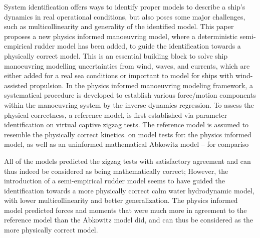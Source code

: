 
System identification offers ways to identify proper models to describe a ship's dynamics in real operational conditions, but also poses some major challenges, such as multicollinearity and generality of the identified model. 
This paper proposes a new physics informed manoeuvring model, where a deterministic semi-empirical rudder model has been added, to guide the identification towards a physically correct model.  
This is an essential building block to solve ship manoeuvring modelling uncertainties from wind, waves, and currents, which are either added for a real sea conditions or important to model for ships with wind-assisted propulsion.
In the physics informed manoeuvring modeling framework, a systematical procedure is developed to establish various force/motion components within the manoeuvring system by the inverse dynamics regression. 
To assess the physical correctness, a reference model, is first established via parameter identification on virtual captive zigzag tests. The reference model is assumed to resemble the physically correct kinetics.  on  model tests for: the physics informed model, as well as an uninformed mathematical Abkowitz model -- for compariso


All of the models predicted the zigzag tests with satisfactory agreement and can thus indeed be considered as being mathematically correct; However, the introduction of a semi-empirical rudder model seems to have guided the identification towards a more physically correct calm water hydrodynamic model, with lower multicollinearity and better generalization. The physics informed model predicted forces and moments that were much more in agreement to the reference model than the Abkowitz model did, and can thus be considered as the more physically correct model. 

